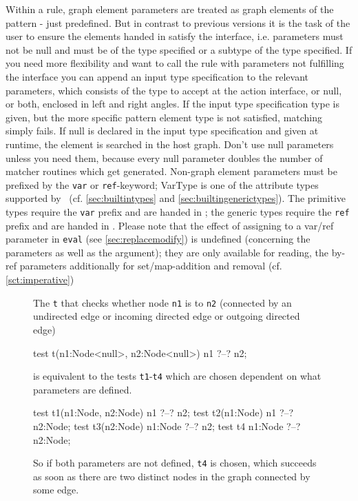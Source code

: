Within a rule, graph element parameters are treated as graph elements of the pattern - just predefined.
But in contrast to previous versions it is the task of the user to ensure the elements handed in satisfy the interface, i.e. parameters must not be null and must be of the type specified or a subtype of the type specified.
If you need more flexibility and want to call the rule with parameters not fulfilling the interface you can append an input type specification to the relevant parameters, which consists of the type to accept at the action interface, or null, or both, enclosed in left and right angles.
If the input type specification type is given, but the more specific pattern element type is not satisfied, matching simply fails.
If null is declared in the input type specification and given at runtime, the element is searched in the host graph.
Don't use null parameters unless you need them, because every null parameter doubles the number of matcher routines which get generated.
Non-graph element parameters must be prefixed by the \texttt{var} or \texttt{ref}-keyword;
VarType is one of the attribute types supported by \GrG\ (cf. \ref{sec:builtintypes} and \ref{sec:builtingenerictypes}).
The primitive types require the \texttt{var} prefix and are handed in ;
the generic types require the \texttt{ref} prefix and are handed in .
Please note that the effect of assigning to a var/ref parameter in \texttt{eval} (see \ref{sec:replacemodify}) is undefined (concerning the parameters as well as the argument);
they are only available for reading, the by-ref parameters additionally for set/map-addition and removal (cf. \ref{sct:imperative})

\begin{figure}[htbp]
\begin{example}
The  \texttt{t} that checks whether node \texttt{n1} is  to \texttt{n2} (connected by an undirected edge or incoming directed edge or outgoing directed edge)
\begin{grgen}
test t(n1:Node<null>, n2:Node<null>) {
  n1 ?--? n2;
}
\end{grgen}
is equivalent to the tests \texttt{t1}-\texttt{t4} which are chosen dependent on what parameters are defined.
\begin{grgen}
test t1(n1:Node, n2:Node) {
  n1 ?--? n2;
}
test t2(n1:Node) {
  n1 ?--? n2:Node;
}
test t3(n2:Node) {
  n1:Node ?--? n2;
}
test t4 {
  n1:Node ?--? n2:Node;
}
\end{grgen}
So if both parameters are not defined, \texttt{t4} is chosen, which succeeds as soon as there are two distinct nodes in the graph connected by some edge.
\end{example}
\end{figure}

